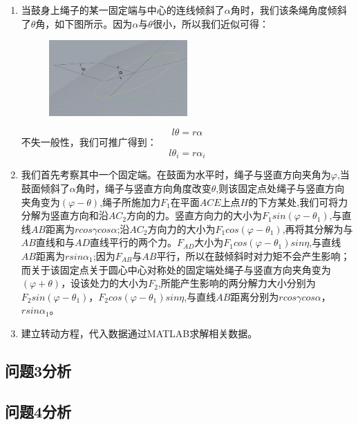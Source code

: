 \documentclass{cumcm}
\begin{document}
\begin{enumerate}
\item 当鼓身上绳子的某一固定端与中心的连线倾斜了$\alpha$角时，我们该条绳角度倾斜了$\theta$角，如下图所示。因为$\alpha$与$\theta$很小，所以我们近似可得：
\begin{figure}[H]
\centering
\includegraphics[width=0.5\textwidth]{img/string1.jpg}
\caption{}
\end{figure}
\begin{displaymath}
l\theta=r\alpha
\end{displaymath}
不失一般性，我们可推广得到：
\begin{equation}
l\theta_i=r\alpha_i
\end{equation}
\item 我们首先考察其中一个固定端。在鼓面为水平时，绳子与竖直方向夹角为$\varphi$,当鼓面倾斜了$\alpha$角时，绳子与竖直方向角度改变$\theta$,则该固定点处绳子与竖直方向夹角变为$(\varphi-\theta)$,绳子所施加力$F_1$在平面$ACE$上点$H$的下方某处,我们可将力分解为竖直方向和沿$AC_2$方向的力。竖直方向力的大小为$F_1sin(\varphi-\theta_1)$,与直线$AB$距离为$rcos\gamma cos\alpha$;沿$AC_2$方向力的大小为$F_1cos(\varphi-\theta_1)$,再将其分解为与$AB$直线和与$AD$直线平行的两个力。$F_{AD}$大小为$F_1cos(\varphi-\theta_1)sin\eta$,与直线$AB$距离为$rsin\alpha_1$;因为$F_{AB}$与$AB$平行，所以在鼓倾斜时对力矩不会产生影响；而关于该固定点关于圆心中心对称处的固定端处绳子与竖直方向夹角变为$(\varphi+\theta)$，设该处力的大小为$F_2$,所能产生影响的两分解力大小分别为$F_2sin(\varphi-\theta_1)$，$F_2cos(\varphi-\theta_1)sin\eta$,与直线$AB$距离分别为$rcos\gamma cos\alpha$，$rsin\alpha_1$。
\item 建立转动方程，代入数据通过MATLAB求解相关数据。
\end{enumerate}
\subsection{问题3分析}
\subsection{问题4分析}
\end{document}
